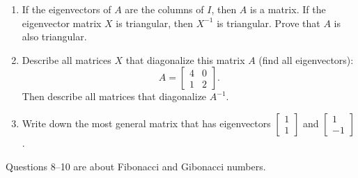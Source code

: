 \documentclass[14pt, a4paper]{article}
\begin{document}
\begin{enumerate}
    \item If the eigenvectors of $A$ are the columns of $I$, then $A$ is a \underline{\hspace{1cm}} matrix. If the eigenvector matrix $X$ is triangular, then $X^{-1}$ is triangular. Prove that $A$ is also triangular.

    \item Describe all matrices $X$ that diagonalize this matrix $A$ (find all eigenvectors):
          \[
              A = \begin{bmatrix} 4 & 0 \\ 1 & 2 \end{bmatrix} .
          \]
          Then describe all matrices that diagonalize $A^{-1}$.

    \item Write down the most general matrix that has eigenvectors $\begin{bmatrix} 1 \\ 1 \end{bmatrix}$ and $\begin{bmatrix} 1 \\ -1 \end{bmatrix}$.
\end{enumerate}

\noindent Questions 8--10 are about Fibonacci and Gibonacci numbers.
\end{document}
